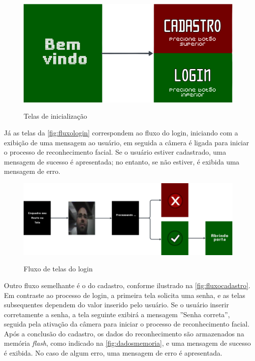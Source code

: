 \begin{figure}[h!]
    \centering
    \caption{Telas de inicialização}
    \includegraphics[scale=0.2]{figuras/fluxo_inicial.png}
    \fonte{}%
    \label{fig:fluxoinicial}
    \centering
\end{figure}

Já as telas da \autoref{fig:fluxologin} 
correspondem ao fluxo do login, iniciando com a 
exibição de uma mensagem ao usuário,  em seguida a 
câmera é ligada para iniciar o processo de reconhecimento facial. 
Se o usuário estiver cadastrado, uma mensagem de sucesso é apresentada; 
no entanto, se não estiver, é exibida uma mensagem de erro.

\begin{figure}[h!]
    \centering
    \caption{Fluxo de telas do login}
    \includegraphics[scale=1.8]{figuras/fluxo_login.png}
    \fonte{}%
    \label{fig:fluxologin}
    \centering
\end{figure}

Outro fluxo semelhante é o do cadastro, conforme ilustrado na \autoref{fig:fluxocadastro}.
Em contraste ao processo de login, a primeira tela solicita uma senha, e as telas 
subsequentes dependem do valor inserido pelo usuário. Se o usuário 
inserir corretamente a senha, a tela seguinte exibirá a mensagem 
''Senha correta'', seguida pela ativação da câmera para iniciar 
o processo de reconhecimento facial.
Após a conclusão do cadastro, os dados do reconhecimento são
armazenados na memória \textit{flash}, como indicado na \autoref{fig:dadosmemoria}, 
e uma mensagem de sucesso é exibida. No caso de algum erro, 
uma mensagem de erro é apresentada.

